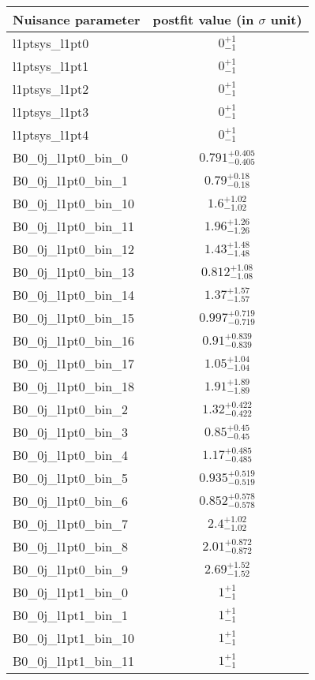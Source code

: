 
\begin{tabular}{|l|c|}
\hline
Nuisance parameter & postfit value (in $\sigma$ unit) \\\hline
l1ptsys\_l1pt0 & $0^{+1}_{-1}$ \\
l1ptsys\_l1pt1 & $0^{+1}_{-1}$ \\
l1ptsys\_l1pt2 & $0^{+1}_{-1}$ \\
l1ptsys\_l1pt3 & $0^{+1}_{-1}$ \\
l1ptsys\_l1pt4 & $0^{+1}_{-1}$ \\
B0\_0j\_l1pt0\_bin\_0 & $0.791^{+0.405}_{-0.405}$ \\
B0\_0j\_l1pt0\_bin\_1 & $0.79^{+0.18}_{-0.18}$ \\
B0\_0j\_l1pt0\_bin\_10 & $1.6^{+1.02}_{-1.02}$ \\
B0\_0j\_l1pt0\_bin\_11 & $1.96^{+1.26}_{-1.26}$ \\
B0\_0j\_l1pt0\_bin\_12 & $1.43^{+1.48}_{-1.48}$ \\
B0\_0j\_l1pt0\_bin\_13 & $0.812^{+1.08}_{-1.08}$ \\
B0\_0j\_l1pt0\_bin\_14 & $1.37^{+1.57}_{-1.57}$ \\
B0\_0j\_l1pt0\_bin\_15 & $0.997^{+0.719}_{-0.719}$ \\
B0\_0j\_l1pt0\_bin\_16 & $0.91^{+0.839}_{-0.839}$ \\
B0\_0j\_l1pt0\_bin\_17 & $1.05^{+1.04}_{-1.04}$ \\
B0\_0j\_l1pt0\_bin\_18 & $1.91^{+1.89}_{-1.89}$ \\
B0\_0j\_l1pt0\_bin\_2 & $1.32^{+0.422}_{-0.422}$ \\
B0\_0j\_l1pt0\_bin\_3 & $0.85^{+0.45}_{-0.45}$ \\
B0\_0j\_l1pt0\_bin\_4 & $1.17^{+0.485}_{-0.485}$ \\
B0\_0j\_l1pt0\_bin\_5 & $0.935^{+0.519}_{-0.519}$ \\
B0\_0j\_l1pt0\_bin\_6 & $0.852^{+0.578}_{-0.578}$ \\
B0\_0j\_l1pt0\_bin\_7 & $2.4^{+1.02}_{-1.02}$ \\
B0\_0j\_l1pt0\_bin\_8 & $2.01^{+0.872}_{-0.872}$ \\
B0\_0j\_l1pt0\_bin\_9 & $2.69^{+1.52}_{-1.52}$ \\
B0\_0j\_l1pt1\_bin\_0 & $1^{+1}_{-1}$ \\
B0\_0j\_l1pt1\_bin\_1 & $1^{+1}_{-1}$ \\
B0\_0j\_l1pt1\_bin\_10 & $1^{+1}_{-1}$ \\
B0\_0j\_l1pt1\_bin\_11 & $1^{+1}_{-1}$ \\

\end{tabular}
